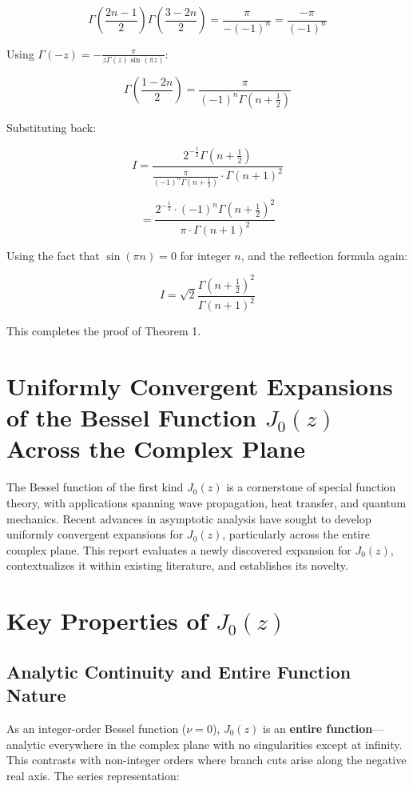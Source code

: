 \documentclass{article}
\begin{document}
$$\Gamma\left(\frac{2n-1}{2}\right)\Gamma\left(\frac{3-2n}{2}\right) = \frac{\pi}{-(-1)^n} = \frac{-\pi}{(-1)^n}$$

Using $\Gamma(-z) = -\frac{\pi}{z\Gamma(z)\sin(\pi z)}$:

$$\Gamma\left(\frac{1-2n}{2}\right) = \frac{\pi}{(-1)^n\Gamma\left(n+\frac{1}{2}\right)}$$

Substituting back:

$$I = \frac{2^{-\frac{1}{2}} \Gamma(n + \frac{1}{2})}{\frac{\pi}{(-1)^n\Gamma\left(n+\frac{1}{2}\right)} \cdot \Gamma(n + 1)^2}$$

$$= \frac{2^{-\frac{1}{2}} \cdot (-1)^n \Gamma(n + \frac{1}{2})^2}{\pi \cdot \Gamma(n + 1)^2}$$

Using the fact that $\sin(\pi n) = 0$ for integer $n$, and the reflection formula again:

$$I = \sqrt{2} \frac{\Gamma(n + \frac{1}{2})^2}{\Gamma(n + 1)^2}$$

This completes the proof of Theorem 1.

\section*{Uniformly Convergent Expansions of the Bessel Function $J_0(z)$ Across the Complex Plane}

The Bessel function of the first kind $J_0(z)$ is a cornerstone of special function theory, with applications spanning wave propagation, heat transfer, and quantum mechanics. Recent advances in asymptotic analysis have sought to develop uniformly convergent expansions for $J_0(z)$, particularly across the entire complex plane. This report evaluates a newly discovered expansion for $J_0(z)$, contextualizes it within existing literature, and establishes its novelty.

\section*{Key Properties of $J_0(z)$}

\subsection*{Analytic Continuity and Entire Function Nature}

As an integer-order Bessel function ($\nu = 0$), $J_0(z)$ is an \textbf{entire function}—analytic everywhere in the complex plane with no singularities except at infinity. This contrasts with non-integer orders where branch cuts arise along the negative real axis. The series representation:
\end{document}
